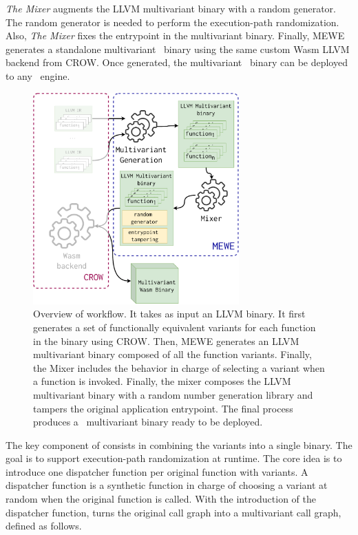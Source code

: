 \emph{The Mixer} augments the LLVM multivariant binary with a random generator. The random generator is needed to perform the execution-path randomization.
Also, \emph{The Mixer} fixes the entrypoint in the multivariant binary.
Finally, MEWE generates a standalone multivariant \wasm\ binary using the same custom Wasm LLVM backend from CROW.
Once generated, the multivariant \wasm\ binary can be deployed to any \wasm\ engine. 

\begin{figure}
  \centering
  \includegraphics[height=3.2in]{diagrams/MEWE.pdf}
  \caption{Overview of \tool workflow. It takes as input an LLVM binary. It first generates a set of functionally equivalent variants for each function in the binary using CROW. Then, MEWE generates an LLVM multivariant binary composed of all the function variants. Finally, the Mixer includes the behavior in charge of selecting a variant when a function is invoked. Finally, the \tool mixer composes the LLVM multivariant binary with a random number generation library and tampers the original application entrypoint. The final process produces a \wasm\ multivariant binary ready to be deployed. }
  \label{workflow}
\end{figure}




The key component of \tool consists in combining the variants into a single binary.
The goal is to support execution-path randomization at runtime.
The core idea is to introduce one dispatcher function per original function with variants.
A dispatcher function is a synthetic function in charge of choosing a variant at random when the original function is called.
With the introduction of the dispatcher function,  \tool turns the original call graph into a multivariant call graph, defined as follows. 


